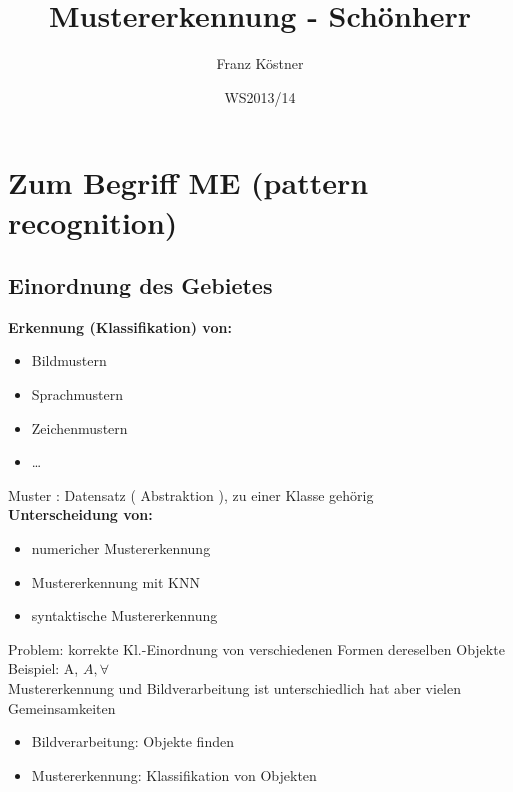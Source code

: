 \documentclass[a4paper,12pt]{scrreprt}
\title{Mustererkennung - Schönherr}
\author{Franz Köstner}
\date{WS2013/14}
\begin{document}
\maketitle

\chapter{Zum Begriff ME (pattern recognition)}

\section{Einordnung des Gebietes}

\textbf{Erkennung (Klassifikation) von:}
\begin{itemize}
 \item Bildmustern
 \item Sprachmustern
 \item Zeichenmustern
 \item \dots
\end{itemize}

Muster : Datensatz ( Abstraktion ), zu einer Klasse gehörig\\

\textbf{Unterscheidung von:}
\begin{itemize}
 \item numericher Mustererkennung
 \item Mustererkennung mit KNN
 \item syntaktische Mustererkennung
\end{itemize}

Problem: korrekte Kl.-Einordnung von verschiedenen Formen dereselben Objekte\\
Beispiel: A, $A, \forall$\\
	
Mustererkennung und Bildverarbeitung ist unterschiedlich hat aber vielen Gemeinsamkeiten\\
\begin{itemize}
 \item Bildverarbeitung: Objekte finden
 \item Mustererkennung: Klassifikation von Objekten
\end{itemize}
\end{document}
